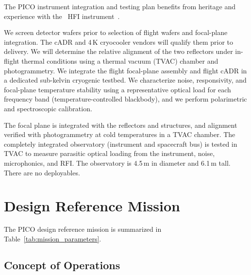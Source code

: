 The PICO instrument integration and testing plan benefits from heritage and experience with the \planck\ HFI instrument~\citep{Pajot2010}.

We screen detector wafers prior to selection of flight wafers and focal-plane integration. The cADR and 4\,K cryocooler vendors will qualify them prior to delivery. We will determine the relative alignment of the two reflectors under in-flight thermal conditions using a thermal vacuum (TVAC) chamber and photogrammetry. We integrate the flight focal-plane assembly and flight cADR in a dedicated sub-kelvin cryogenic testbed. We characterize noise, responsivity, and focal-plane temperature stability using a representative optical load for each frequency band (temperature-controlled blackbody), and we perform polarimetric and spectroscopic calibration.



The focal plane is integrated with the reflectors and structures, and alignment verified with photogrammetry at cold temperatures in a TVAC chamber.  The completely integrated observatory (instrument and spacecraft bus) is tested in TVAC to measure parasitic optical loading from the instrument, noise, microphonics, and RFI. The observatory is 4.5\,m in diameter and 6.1\,m tall. There are no deployables.

\bigskip
\section{Design Reference Mission}
\label{sec:design_reference} %
%

%
The PICO design reference mission is summarized in Table~\ref{tab:mission_parameters}.

\subsection{Concept of Operations}
\label{sec:operations} %

